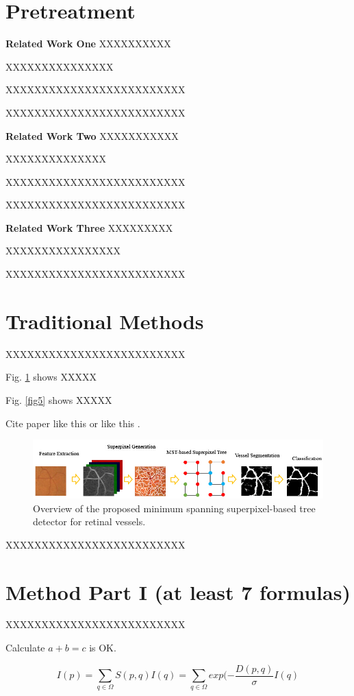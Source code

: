 \documentclass[journal]{IEEEtran}
\begin{document}
\section{Pretreatment}
\textbf{Related Work One} XXXXXXXXXX

XXXXXXXXXXXXXXX

XXXXXXXXXXXXXXXXXXXXXXXXX

XXXXXXXXXXXXXXXXXXXXXXXXX

\textbf{Related Work Two} XXXXXXXXXXX

XXXXXXXXXXXXXX

XXXXXXXXXXXXXXXXXXXXXXXXX

XXXXXXXXXXXXXXXXXXXXXXXXX

\textbf{Related Work Three} XXXXXXXXX

XXXXXXXXXXXXXXXX

XXXXXXXXXXXXXXXXXXXXXXXXX


\section{Traditional Methods}
XXXXXXXXXXXXXXXXXXXXXXXXX

Fig. \ref{fig1} shows XXXXX

Fig. \ref{fig5} shows XXXXX

Cite paper like this \cite{Chaudhuri_1989} or like this \cite{Chaudhuri_1989,Li_2014}.

\begin{figure}
\centering
\footnotesize
\centerline{\includegraphics[width=0.9\linewidth]{Fig1.jpg}}
\caption{Overview of the proposed minimum spanning superpixel-based tree detector for retinal vessels.}
\label{fig1}
\end{figure}

XXXXXXXXXXXXXXXXXXXXXXXXX

\section{Method Part I (at least 7 formulas)}
XXXXXXXXXXXXXXXXXXXXXXXXX

Calculate $a+b=c$ is OK.

\begin{equation} \label{Eq_1}
I(p)= \sum_{q\in\Omega}S(p,q)I(q)=\sum_{q\in\Omega}exp(-\frac{D(p,q)}{\sigma}I(q)
\end{equation}
\end{document}
